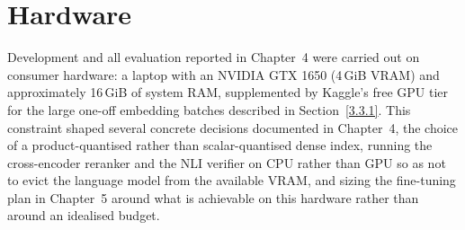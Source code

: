 \section{Hardware}\label{3.10}

Development and all evaluation reported in Chapter~4 were carried out on
consumer hardware: a laptop with an NVIDIA GTX 1650 (4\,GiB VRAM) and
approximately 16\,GiB of system RAM, supplemented by Kaggle's free GPU
tier for the large one-off embedding batches described in
Section~\ref{3.3.1}. This constraint shaped several concrete decisions
documented in Chapter~4, the choice of a product-quantised rather than
scalar-quantised dense index, running the cross-encoder reranker and the
NLI verifier on CPU rather than GPU so as not to evict the language model
from the available VRAM, and sizing the fine-tuning plan in Chapter~5
around what is achievable on this hardware rather than around an idealised
budget.
